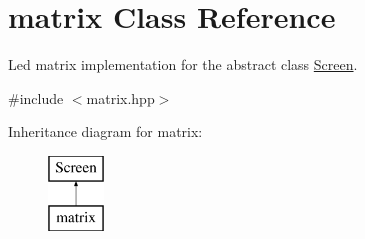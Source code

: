 \hypertarget{classmatrix}{}\section{matrix Class Reference}
\label{classmatrix}


Led matrix implementation for the abstract class \hyperlink{class_screen}{Screen}.  




{\ttfamily \#include $<$matrix.\+hpp$>$}

Inheritance diagram for matrix\+:\begin{figure}[H]
\begin{center}
\leavevmode
\includegraphics[height=2.000000cm]{classmatrix}
\end{center}
\end{figure}
